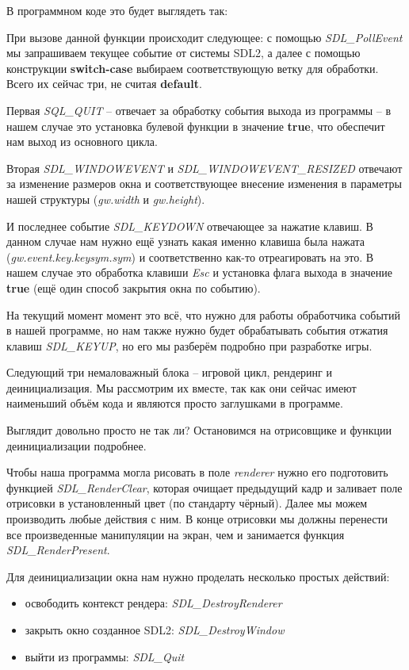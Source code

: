 В программном коде это будет выглядеть так:


При вызове данной функции происходит следующее: с помощью \emph{SDL\_PollEvent} мы запрашиваем текущее 
событие от системы SDL2, а далее с помощью конструкции \textbf{switch-case} выбираем соответствующую 
ветку для обработки. Всего их сейчас три, не считая \textbf{default}. 

Первая \emph{SQL\_QUIT} -- отвечает за обработку события выхода из программы -- в нашем случае это 
установка булевой функции в значение \textbf{true}, что обеспечит нам выход из основного цикла.

Вторая \emph{SDL\_WINDOWEVENT} и \emph{SDL\_WINDOWEVENT\_RESIZED} отвечают за изменение размеров 
окна и соответствующее внесение изменения в параметры нашей структуры (\emph{gw.width} и 
\emph{gw.height}).

И последнее событие \emph{SDL\_KEYDOWN} отвечающее за нажатие клавиш. В данном случае нам нужно 
ещё узнать какая именно клавиша была нажата (\emph{gw.event.key.keysym.sym}) и соответственно 
как-то отреагировать на это. В нашем случае это обработка клавиши \emph{Esc} и установка флага 
выхода в значение \textbf{true} (ещё один способ закрытия окна по событию).

На текущий момент момент это всё, что нужно для работы обработчика событий в нашей программе, но нам 
также нужно будет обрабатывать события отжатия клавиш \emph{SDL\_KEYUP}, но его мы разберём подробно 
при разработке игры.

Следующий три немаловажный блока -- игровой цикл, рендеринг и деинициализация. Мы рассмотрим их 
вместе, так как они сейчас имеют наименьший объём кода и являются просто заглушками в программе.


Выглядит довольно просто не так ли? Остановимся на отрисовщике и функции деинициализации подробнее.

Чтобы наша программа могла рисовать в поле \emph{renderer} нужно его подготовить функцией 
\emph{SDL\_RenderClear}, которая очищает предыдущий кадр и заливает поле отрисовки в установленный 
цвет (по стандарту чёрный). Далее мы можем производить любые действия с ним. В конце отрисовки мы 
должны перенести все произведенные манипуляции на экран, чем и занимается функция 
\emph{SDL\_RenderPresent}.

Для деинициализации окна нам нужно проделать несколько простых действий:
\begin{itemize}\itemsep-5pt
    \item освободить контекст рендера: \emph{SDL\_DestroyRenderer}
    \item закрыть окно созданное SDL2: \emph{SDL\_DestroyWindow}
    \item выйти из программы: \emph{SDL\_Quit}
\end{itemize}

